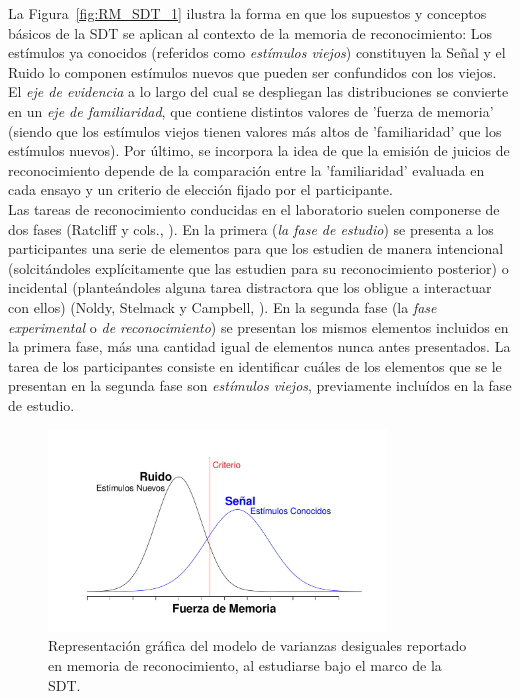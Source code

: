 La Figura~\ref{fig:RM_SDT_1} ilustra la forma en que los supuestos y conceptos básicos de la SDT se aplican al contexto de la memoria de reconocimiento: Los estímulos ya conocidos (referidos como \textit{estímulos viejos}) constituyen la Señal y el Ruido lo componen estímulos nuevos que pueden ser confundidos con los viejos. El \textit{eje de evidencia} a lo largo del cual se despliegan las distribuciones se convierte en un \textit{eje de familiaridad}, que contiene distintos valores de 'fuerza de memoria' (siendo que los estímulos viejos tienen valores más altos de 'familiaridad' que los estímulos nuevos). Por último, se incorpora la idea de que la emisión de juicios de reconocimiento depende de la comparación entre la 'familiaridad' evaluada en cada ensayo y un criterio de elección fijado por el participante.\\

Las tareas de reconocimiento conducidas en el laboratorio suelen componerse de dos fases (Ratcliff y cols., \citeyear{Ratcliff1992}). En la primera (\textit{la fase de estudio}) se presenta a los participantes una serie de elementos para que los estudien de manera intencional (solcitándoles explícitamente que las estudien para su reconocimiento posterior) o incidental (planteándoles alguna tarea distractora que los obligue a interactuar con ellos) (Noldy, Stelmack y Campbell, \citeyear{Noldy1990}). En la segunda fase (la \textit{fase experimental} o \textit{de reconocimiento}) se presentan los mismos elementos incluidos en la primera fase, más una cantidad igual de elementos nunca antes presentados. La tarea de los participantes consiste en identificar cuáles de los elementos que se le presentan en la segunda fase son \textit{estímulos viejos}, previamente incluídos en la fase de estudio.\\

\begin{figure}[h]
\centering
\includegraphics[width=0.80\textwidth]{Figures/RM_SDT_2} 
\caption[SDT en memoria de reconocimiento (varianzas desiguales)]{Representación gráfica del modelo de varianzas desiguales reportado en memoria de reconocimiento, al estudiarse bajo el marco de la SDT.}
\label{fig:RM_SDT_2}
\end{figure}

